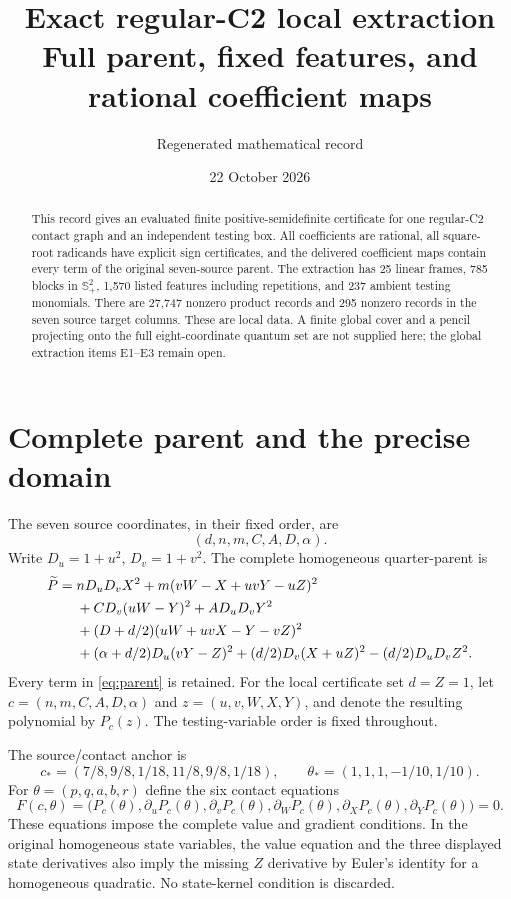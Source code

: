 \documentclass[11pt]{article}
\title{Exact regular-C2 local extraction\\\large Full parent, fixed features, and rational coefficient maps}
\author{Regenerated mathematical record}
\date{22 October 2026}
\newcommand{\Splus}{\mathbb S_+}
\theoremstyle{definition}
\begin{document}
\maketitle

\begin{abstract}
This record gives an evaluated finite positive-semidefinite certificate for one
regular-C2 contact graph and an independent testing box. All coefficients are
rational, all square-root radicands have explicit sign certificates, and the
delivered coefficient maps contain every term of the original seven-source
parent. The extraction has 25 linear frames, 785 blocks in $\Splus^2$, 1,570
listed features including repetitions, and 237 ambient testing monomials.
There are 27,747 nonzero product records and 295 nonzero records in the seven
source target columns. These are local data. A finite global cover and a pencil
projecting onto the full eight-coordinate quantum set are not supplied here;
the global extraction items E1--E3 remain open.
\end{abstract}

\section{Complete parent and the precise domain}

The seven source coordinates, in their fixed order, are
\[
  (d,n,m,C,A,D,\alpha).
\]
Write $D_u=1+u^2$, $D_v=1+v^2$. The complete homogeneous quarter-parent is
\begin{align}
\widetilde P={}&nD_uD_vX^2
 +m(vW-X+uvY-uZ)^2\notag\\
 &+CD_v(uW-Y)^2+AD_uD_vY^2\notag\\
 &+(D+d/2)(uW+uvX-Y-vZ)^2\notag\\
 &+(\alpha+d/2)D_u(vY-Z)^2
 +(d/2)D_v(X+uZ)^2-(d/2)D_uD_vZ^2.
 \label{eq:parent}
\end{align}
Every term in \eqref{eq:parent} is retained. For the local certificate set
$d=Z=1$, let $c=(n,m,C,A,D,\alpha)$ and $z=(u,v,W,X,Y)$, and denote the resulting
polynomial by $P_c(z)$. The testing-variable order is fixed throughout.

The source/contact anchor is
\begin{equation}
 c_*=(7/8,9/8,1/18,11/8,9/8,1/18),\qquad
 \theta_*=(1,1,1,-1/10,1/10).
 \label{eq:anchor}
\end{equation}
For $\theta=(p,q,a,b,r)$ define the six contact equations
\begin{equation}
  F(c,\theta)=\bigl(P_c(\theta),\partial_uP_c(\theta),
  \partial_vP_c(\theta),\partial_WP_c(\theta),
  \partial_XP_c(\theta),\partial_YP_c(\theta)\bigr)=0.
  \label{eq:contact}
\end{equation}
These equations impose the complete value and gradient conditions. In the
original homogeneous state variables, the value equation and the three
displayed state derivatives also imply the missing $Z$ derivative by Euler's
identity for a homogeneous quadratic. No state-kernel condition is discarded.
\end{document}

